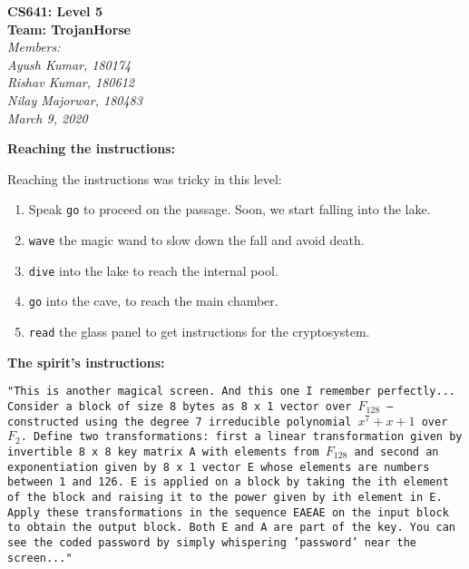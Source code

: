 \documentclass[11pt]{article}
\begin{document}
\begin{center}
  \Large\textbf{CS641: Level 5}\\
  \Large\textbf{Team: TrojanHorse}\\
  \medskip
  \large\textit{Members:\quad}\\
  \large\textit{Ayush Kumar, 180174\quad}\\
  \large\textit{Rishav Kumar, 180612\quad}\\
  \large\textit{Nilay Majorwar, 180483\quad}\\
  \medskip
  \large\textit{March 9, 2020\quad}
\end{center}

\bigskip
\bigskip

\textbf{Reaching the instructions: }
\medskip

Reaching the instructions was tricky in this level:
\begin{enumerate}
  \item Speak \texttt{go} to proceed on the passage. Soon, we start falling into the lake.
  \item \texttt{wave} the magic wand to slow down the fall and avoid death.
  \item \texttt{dive} into the lake to reach the internal pool.
  \item \texttt{go} into the cave, to reach the main chamber.
  \item \texttt{read} the glass panel to get instructions for the cryptosystem.
\end{enumerate}

\bigskip
\bigskip

\textbf{The spirit's instructions: }

\begin{center}
  \texttt{"This is another magical screen. And this one I remember perfectly... Consider a block of size 8 bytes as 8 x 1 vector over $F_{128}$ -- constructed using the degree 7 irreducible polynomial $x^7 + x + 1$ over $F_2$. Define two transformations: first a linear transformation given by invertible 8 x 8 key matrix A with elements from $F_{128}$ and second an exponentiation given by 8 x 1 vector E whose elements are numbers between 1 and 126. E is applied on a block by taking the ith element of the block and raising it to the power given by ith element in E. Apply these transformations in the sequence EAEAE on the input block to obtain the output block. Both E and A are part of the key. You can see the coded password by simply whispering 'password' near the screen..."}
\end{center}
\end{document}
